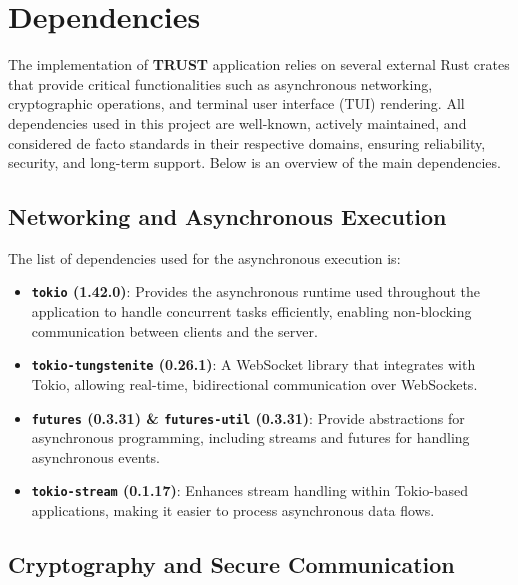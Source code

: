 \section{Dependencies}
\label{sec:Dependecies}


The implementation of \textbf{TRUST} application relies on several external Rust crates that provide critical functionalities such as asynchronous networking, cryptographic operations, and terminal user interface (TUI) rendering. All dependencies used in this project are well-known, actively maintained, and considered de facto standards in their respective domains, ensuring reliability, security, and long-term support. Below is an overview of the main dependencies.   

\subsection{Networking and Asynchronous Execution}
\label{subsec:NetworkingAndAsynchronousExecution}

The list of dependencies used for the asynchronous execution is:

\begin{itemize}
  \item \textbf{\texttt{tokio} (1.42.0)}: Provides the asynchronous runtime used throughout the application to handle concurrent tasks efficiently, enabling non-blocking communication between clients and the server.
  \item \textbf{\texttt{tokio-tungstenite} (0.26.1)}: A WebSocket library that integrates with Tokio, allowing real-time, bidirectional communication over WebSockets.
  \item \textbf{\texttt{futures} (0.3.31) \& \texttt{futures-util} (0.3.31)}: Provide abstractions for asynchronous programming, including streams and futures for handling asynchronous events.
  \item \textbf{\texttt{tokio-stream} (0.1.17)}: Enhances stream handling within Tokio-based applications, making it easier to process asynchronous data flows.
\end{itemize}

\subsection{Cryptography and Secure Communication}
\label{subsec:CryptographyAndSecureCommunication}

